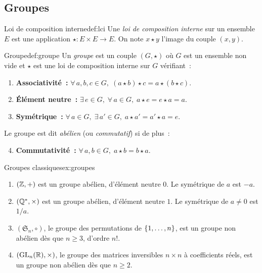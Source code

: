\subsection{Groupes}\label{subsec:groupes}

\begin{definition}{Loi de composition interne}{def:lci}
  Une \emph{loi de composition interne}
  sur un ensemble $E$ est une application $\star\colon E\times E\to E$.
  On note $x\star y$ l'image du couple $(x,y)$.
\end{definition}

\begin{definition}{Groupe}{def:groupe}
  Un \emph{groupe} est un couple $(G,\star)$ où $G$ est un
  ensemble non vide et $\star$ est une loi de composition interne sur $G$
  vérifiant~:
  \begin{enumerate}[label=\textbf{(G\arabic*)}]
    \item \textbf{Associativité~:} $\forall\, a,b,c\in G,\;
      (a\star b)\star c = a\star(b\star c)$.
    \item \textbf{Élément neutre~:} $\exists\, e\in G,\;
      \forall\, a\in G,\; a\star e = e\star a = a$.
    \item \textbf{Symétrique~:} $\forall\, a\in G,\;\exists\, a'\in G,\;
      a\star a' = a'\star a = e$.
  \end{enumerate}
  Le groupe est dit \emph{abélien} (ou
  \emph{commutatif}) si de plus~:
  \begin{enumerate}[label=\textbf{(G\arabic*)}]
    \setcounter{enumi}{3}
    \item \textbf{Commutativité~:} $\forall\, a,b\in G,\;
      a\star b = b\star a$.
  \end{enumerate}
\end{definition}

\begin{example}{Groupes classiques}{ex:groupes}
  \begin{enumerate}[label=(\alph*)]
    \item $({\mathbb{Z}},+)$ est un groupe abélien, d'élément neutre $0$.
      Le symétrique de $a$ est $-a$.
    \item $({\mathbb{Q}}^*,\times)$ est un groupe abélien, d'élément neutre $1$.
      Le symétrique de $a\neq 0$ est $1/a$.
    \item $(\mathfrak{S}_n,\circ)$, le groupe des permutations de
      $\left\{1,\ldots,n\right\}$, est un groupe non abélien dès que $n\geq 3$,
      d'ordre $n!$.
    \item $(\operatorname{GL}_n({\mathbb{R}}),\times)$, le groupe des matrices inversibles
      $n\times n$ à coefficients réels, est un groupe non abélien dès
      que $n\geq 2$.
  \end{enumerate}
\end{example}

